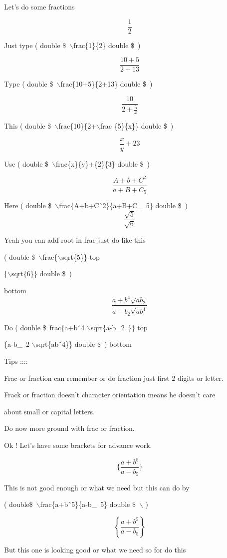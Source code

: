 \documentclass[11pt]{article}
\begin{document}
Let's do some fractions

$$\frac{1}{2}$$

Just type ( double \$\ $\backslash$frac\{1\}\{2\} double \$\ )

$$\frac{10+5}{2+13}$$

Type ( double \$\ $\backslash$frac\{10+5\}\{2+13\} double \$\ )

$$\frac{10}{2+\frac{5}{x}}$$

This ( double \$\ $\backslash$frac\{10\}\{2+$\backslash$frac \{5\}\{x\}\} double \$\ )

$$\frac{x}{y}+{2}{3}$$

Use ( double \$\ $\backslash$frac\{x\}\{y\}+\{2\}\{3\} double \$\ )

$$\frac{A+b+C^2}{a+B+C_5}$$

Here ( double \$\ $\backslash$frac\{A+b+C\^\ 2\}\{a+B+C\_\ 5\} double \$\ )
$$\frac{\sqrt{5}}{\sqrt{6}}$$

Yeah you can add root in frac just do like this  

{( double \$\ $\backslash$frac\{$\backslash$sqrt\{5\}\} top

             \{$\backslash$sqrt\{6\}\} double \$\ )} bottom
 $$\frac{a+b^4\sqrt{ab_2}}{a-b_2\sqrt{ab^4}}$$
 
 Do ( double \$\ frac\{a+b\^\ 4 $\backslash$sqrt\{a-b\_2\ \}\} top
 
          \{a-b\_\ 2 $\backslash$sqrt\{ab\^\ 4\}\} double \$\ ) bottom
          
          
\vspace{1cm}

Tips ::::

Frac or fraction can remember or do fraction just first 2 digits or letter.

Frack or fraction doesn't character orientation means he doesn't care

about small or capital letters.

Do now more ground with frac or fraction.
\pagebreak

Ok ! Let's have some brackets for advance work.

$$\{\frac{a+b^5}{a-b_5}\}$$

This is not good enough or what we need but this can do by

( double\$\ $\backslash$frac\{a+b\^\ 5\}\{a-b\_\ 5\} double \$\ $\backslash$ )

$$\left\{\frac{a+b^5}{a-b_5}\right\}$$

But this one is looking good or what we need so for do this
\end{document}
